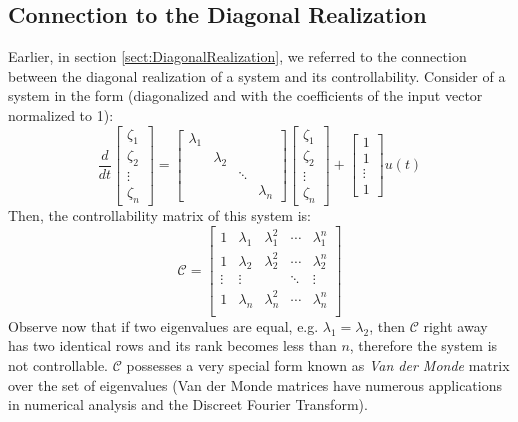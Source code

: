 \documentclass[a4paper,10pt,oneside]{book}
\begin{document}
\subsection{Connection to the Diagonal Realization}
Earlier, in section \ref{sect:DiagonalRealization}, we referred to the connection between the diagonal realization of a system and its controllability. Consider of a system in the form (diagonalized and with the coefficients of the input vector normalized to 1):
\begin{equation}
 \frac{d}{dt}\left[ {\begin{array}{c}
 \zeta_1 \\
 \zeta_2 \\
 \vdots  \\
 \zeta_n
 \end{array} } \right] = 
\left[ {\begin{array}{cccc}
 \lambda_1 & & & \\
 & \lambda_2 & & \\
 & & \ddots & \\
 & & & \lambda_n
 \end{array} } \right]
\left[ {\begin{array}{c}
 \zeta_1 \\
 \zeta_2 \\
 \vdots  \\
 \zeta_n
 \end{array} } \right]+
\left[ {\begin{array}{c}
 1 \\
 1 \\
 \vdots  \\
 1
 \end{array} } \right]
 u(t)
\end{equation} 
Then, the controllability matrix of this system is:
\begin{equation}
 \mathcal{C} = \left[ {\begin{array}{ccccc}
 1 & \lambda_1 & \lambda_1^2 & \cdots & \lambda_1^n \\
 1 & \lambda_2 & \lambda_2^2 & \cdots & \lambda_2^n \\
 \vdots & \vdots &           & \ddots & \vdots \\
 1 & \lambda_n & \lambda_n^2 & \cdots & \lambda_n^n \\
 \end{array} } \right]
\end{equation}
Observe now that if two eigenvalues are equal, e.g. $\lambda_1=\lambda_2$, then $\mathcal{C}$ right away has two identical rows and its rank becomes less than $n$, therefore the system is not controllable. $\mathcal{C}$ possesses a very special form known as \emph{Van der Monde} matrix over the set of eigenvalues (Van der Monde matrices have numerous applications in numerical analysis and the Discreet Fourier Transform).
\end{document}
